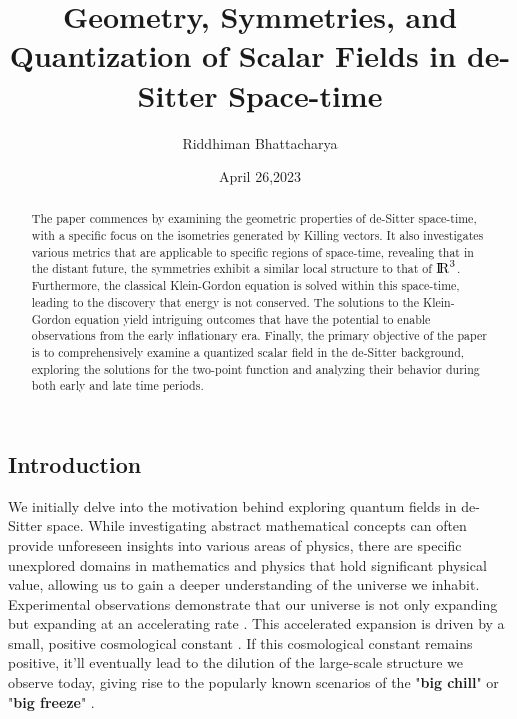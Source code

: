 \documentclass[a4paper,11pt]{article}
\title{\Huge \textbf{Geometry, Symmetries, and Quantization of Scalar Fields in de-Sitter Space-time}}
\author{\Large Riddhiman Bhattacharya}
\date{April 26,2023}
\numberwithin{equation}{section}
\numberwithin{figure}{section}
\begin{document}
\begin{large}

\clearpage
\maketitle
\thispagestyle{empty}


\newpage

\begin{abstract}
    The paper commences by examining the geometric properties of de-Sitter space-time, with a specific focus on the isometries generated by Killing vectors. It also investigates various metrics that are applicable to specific regions of space-time, revealing that in the distant future, the symmetries exhibit a similar local structure to that of ${\rm I\!R}^3$. Furthermore, the classical Klein-Gordon equation is solved within this space-time, leading to the discovery that energy is not conserved. The solutions to the Klein-Gordon equation yield intriguing outcomes that have the potential to enable observations from the early inflationary era. Finally, the primary objective of the paper is to comprehensively examine a quantized scalar field in the de-Sitter background, exploring the solutions for the two-point function and analyzing their behavior during both early and late time periods.
\end{abstract}

\newpage

\tableofcontents


\newpage

\section{\Large Introduction}

We initially delve into the motivation behind exploring quantum fields in de-Sitter space. While investigating abstract mathematical concepts can often provide unforeseen insights into various areas of physics, there are specific unexplored domains in mathematics and physics that hold significant physical value, allowing us to gain a deeper understanding of the universe we inhabit.
Experimental observations demonstrate that our universe is not only expanding but expanding at an accelerating rate \cite{supernova1,supernova2}. This accelerated expansion is driven by a small, positive cosmological constant \cite{cosmoconst}. If this cosmological constant remains positive, it'll eventually lead to the dilution of the large-scale structure we observe today, giving rise to the popularly known scenarios of the "\textbf{big chill}" or "\textbf{big freeze}" \cite{future structure}.


\end{large}
\end{document}

